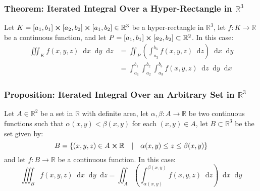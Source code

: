 \documentclass[11pt, a4paper]{article}
\newcommand{\diff}{\mathop{}\!\mathrm{d}} %
\begin{document}
\subsubsection{Theorem: Iterated Integral Over a Hyper-Rectangle in $ \mathbb{R}^3 $}
Let $ K = [a_1, b_1] \cross [a_2, b_2] \cross [a_1, b_2] \in \mathbb{R}^3 $ be a hyper-rectangle in $ \mathbb{R}^3 $, let $ f : K \rightarrow \mathbb{R} $ be a continuous function, and let $ P = [a_1, b_1] \cross [a_2, b_2] \subset \mathbb{R}^2 $. In this case: 
\begin{align*}
\iiint_K f(x, y, z)\diff x \diff y \diff z &= \iint_P \left(\int_{a_3}^{b_3}f(x, y, z)\diff z \right) \diff x \diff y \\[1.5ex]
&= \int_{a_1}^{b_1} \int_{a_2}^{b_2} \int_{a_3}^{b_3} f(x, y, z) \diff z \diff y \diff x
\end{align*}

\subsubsection{Proposition: Iterated Integral Over an Arbitrary Set in $ \mathbb{R}^3 $}
Let $ A \in \mathbb{R}^2 $ be a set in $ \mathbb{R} $ with definite area, let $ \alpha, \beta : A \rightarrow \mathbb{R} $ be two continuous functions such that $ \alpha (x, y) < \beta(x, y) $ for each $ (x, y) \in A$, let $ B \subset \mathbb{R}^3 $ be the set given by:
\begin{equation*}
	B = \{(x, y, z) \in A \cross \mathbb{R} \quad | \quad \alpha(x, y) \leq z \leq \beta(x, y)  \}
\end{equation*}
and let $ f : B \rightarrow \mathbb{R}$ be a continuous function. In this case:
\begin{equation*}
	\iiint_B f(x, y, z)\diff x \diff y \diff z = \iint_A \left(\int_{\alpha(x, y)}^{\beta (x, y)}f(x, y, z)\diff z \right) \diff x \diff y
\end{equation*}
\end{document}
